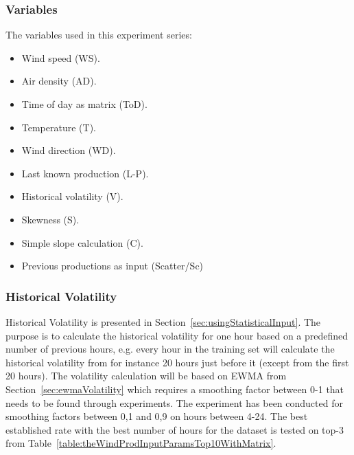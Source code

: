 \subsubsection{Variables}
The variables used in this experiment series:

\begin{itemize}
\item Wind speed (WS).
\item Air density (AD).
\item Time of day as matrix (ToD).
\item Temperature (T).
\item Wind direction (WD).
\item Last known production (L-P).
\item Historical volatility (V).
\item Skewness (S).
\item Simple slope calculation (C).
\item Previous productions as input (Scatter/Sc)
\end{itemize}

\subsubsection{Historical Volatility}
\label{sec:predictionHistVol}
Historical Volatility is presented in Section~\ref{sec:usingStatisticalInput}. The purpose is to calculate the historical volatility for one hour based on a predefined number of previous hours, e.g. every hour in the training set will calculate the historical volatility from for instance 20 hours just before it (except from the first 20 hours). The volatility calculation will be based on EWMA from Section~\ref{sec:ewmaVolatility} which requires a smoothing factor between 0-1 that needs to be found through experiments. The experiment has been conducted for smoothing factors between 0,1 and 0,9 on hours between 4-24. The best established rate with the best number of hours for the dataset is tested on top-3 from Table~\ref{table:theWindProdInputParamsTop10WithMatrix}.

